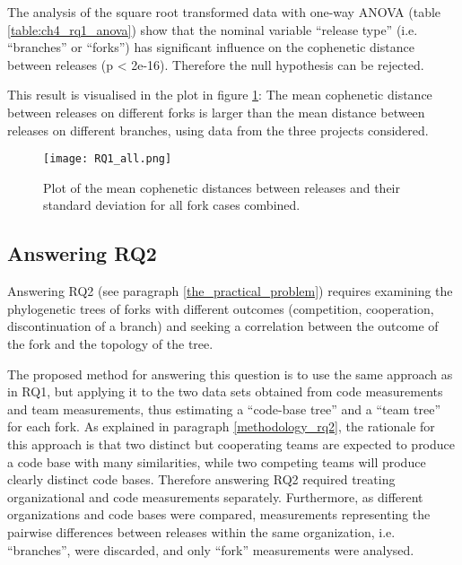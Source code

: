 The analysis of the square root transformed data with one-way ANOVA (table \ref{table:ch4_rq1_anova}) show that the nominal variable “release type” (i.e. “branches” or “forks”) has significant influence on the cophenetic distance between releases (p < 2e-16). Therefore the null hypothesis can be rejected.



This result is visualised in the plot in figure \ref{fig:rq1_all}: The mean cophenetic distance between releases on different forks is larger than the mean distance between releases on different branches, using data from the three projects considered.

\begin{figure}[H]
  \texttt{[image: RQ1\_all.png]}
  \caption{Plot of the mean cophenetic distances between releases and their standard deviation for all fork cases combined.}
  \label{fig:rq1_all}
\end{figure}

\subsection{Answering RQ2}
Answering RQ2 (see paragraph \ref{the_practical_problem}) requires examining the phylogenetic trees of forks with different outcomes (competition, cooperation, discontinuation of a branch) and seeking a correlation between the outcome of the fork and the topology of the tree.

The proposed method for answering this question is to use the same approach as in RQ1, but applying it to the two data sets obtained from code measurements and team measurements, thus estimating a “code-base tree” and a “team tree” for each fork. As explained in paragraph \ref{methodology_rq2}, the rationale for this approach is that two distinct but cooperating teams are expected to produce a code base with many similarities, while two competing teams will produce clearly distinct code bases. Therefore answering RQ2 required treating organizational and code measurements separately. Furthermore, as different organizations and code bases were compared, measurements representing the pairwise differences between releases within the same organization, i.e. “branches”, were discarded, and only “fork” measurements were analysed.

